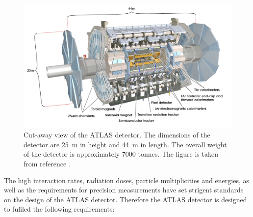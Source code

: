 \begin{figure}[bht]
\begin{centering}	
\includegraphics[width=1.0\textwidth]{Detector/plots/Cut-away-view-of-the-ATLAS-detector.png}
\caption{Cut-away view of the ATLAS detector. 
The dimensions of the detector are 25~m in
height and 44~m in length. The overall weight 
of the detector is approximately 7000 tonnes. The figure is taken from reference \cite{PERF-2007-01}.
	}
\label{fig:ATLAS_cut_away}
\end{centering}
\end{figure}

The high interaction rates, radiation doses, particle multiplicities 
and energies, as well as the requirements for precision measurements 
have set strigent standards on the design of the ATLAS detector. 
Therefore the ATLAS detector is designed to fufiled the following 
requirements:

